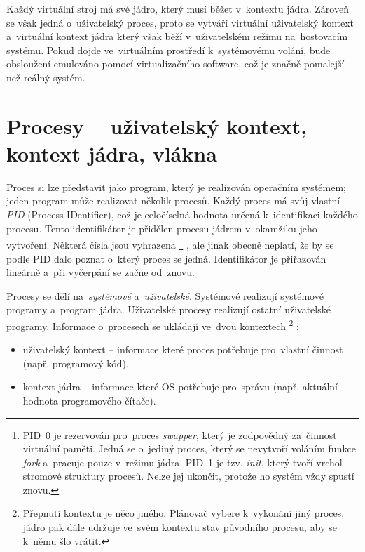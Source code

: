 Každý virtuální stroj má své jádro, který musí běžet v~kontextu jádra. Zároveň se však jedná o~uživatelský proces, proto se vytváří virtuální uživatelský kontext a~virtuální kontext jádra který však běží v~uživatelském režimu na~hostovacím systému. Pokud dojde ve~virtuálním prostředí k~systémovému volání, bude obsloužení emulováno pomocí virtualizačního software, což je značně pomalejší než reálný systém.


\clearpage
\section{Procesy -- uživatelský kontext, kontext jádra, vlákna}
\label{procesy}

Proces si lze představit jako program, který je realizován operačním systémem; jeden program může realizovat několik procesů. Každý proces má svůj vlastní \emph{PID} (Process IDentifier), což je celočíselná hodnota určená k~identifikaci každého procesu. Tento identifikátor je přidělen procesu jádrem v~okamžiku jeho vytvoření. Některá čísla jsou vyhrazena%
\footnote{PID~0 je rezervován pro~proces \emph{swapper}, který je zodpovědný za~činnost virtuální paměti. Jedná se o~jediný proces, který se nevytvoří voláním funkce \emph{fork} a~pracuje pouze v~režimu jádra. PID~1 je tzv. \emph{init}, který tvoří vrchol stromové struktury procesů. Nelze jej ukončit, protože ho systém vždy spustí znovu.}%
, ale jinak obecně neplatí, že by se podle PID dalo poznat o~který proces se jedná. Identifikátor je přiřazován lineárně a~při vyčerpání se začne od~znovu.

Procesy se dělí na~\emph{systémové} a~\emph{uživatelské}. Systémové realizují systémové programy a~program jádra. Uživatelské procesy realizují ostatní uživatelské programy. Informace o~procesech se ukládají ve~dvou kontextech%
\footnote{Přepnutí kontextu je něco jiného. Plánovač vybere k~vykonání jiný proces, jádro pak dále udržuje ve~svém kontextu stav původního procesu, aby se k~němu šlo vrátit.}%
:

\begin{itemize}
	\item uživatelský kontext -- informace které proces potřebuje pro~vlastní činnost (např. programový kód),
	\item kontext jádra -- informace které OS potřebuje pro~správu (např. aktuální hodnota programového čítače).
\end{itemize}


